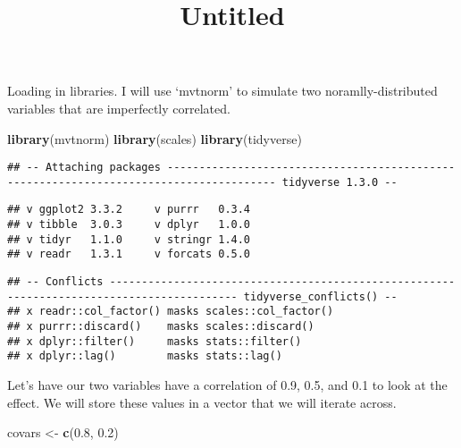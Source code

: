 \documentclass[
]{article}
\title{Untitled}
\author{}
\date{\vspace{-2.5em}}
\newenvironment{Shaded}{\begin{snugshade}}{\end{snugshade}}
\newcommand{\FloatTok}[1]{\textcolor[rgb]{0.00,0.00,0.81}{#1}}
\newcommand{\KeywordTok}[1]{\textcolor[rgb]{0.13,0.29,0.53}{\textbf{#1}}}
\newcommand{\NormalTok}[1]{#1}
\newcommand{\StringTok}[1]{\textcolor[rgb]{0.31,0.60,0.02}{#1}}
\begin{document}
\maketitle

Loading in libraries. I will use `mvtnorm' to simulate two
noramlly-distributed variables that are imperfectly correlated.

\begin{Shaded}
\begin{Highlighting}[]
\KeywordTok{library}\NormalTok{(mvtnorm)}
\KeywordTok{library}\NormalTok{(scales)}
\KeywordTok{library}\NormalTok{(tidyverse)}
\end{Highlighting}
\end{Shaded}

\begin{verbatim}
## -- Attaching packages --------------------------------------------------------------------------------------- tidyverse 1.3.0 --
\end{verbatim}

\begin{verbatim}
## v ggplot2 3.3.2     v purrr   0.3.4
## v tibble  3.0.3     v dplyr   1.0.0
## v tidyr   1.1.0     v stringr 1.4.0
## v readr   1.3.1     v forcats 0.5.0
\end{verbatim}

\begin{verbatim}
## -- Conflicts ------------------------------------------------------------------------------------------ tidyverse_conflicts() --
## x readr::col_factor() masks scales::col_factor()
## x purrr::discard()    masks scales::discard()
## x dplyr::filter()     masks stats::filter()
## x dplyr::lag()        masks stats::lag()
\end{verbatim}

Let's have our two variables have a correlation of 0.9, 0.5, and 0.1 to
look at the effect. We will store these values in a vector that we will
iterate across.

\begin{Shaded}
\begin{Highlighting}[]
\NormalTok{covars <-}\StringTok{ }\KeywordTok{c}\NormalTok{(}\FloatTok{0.8}\NormalTok{, }\FloatTok{0.2}\NormalTok{)}
\end{Highlighting}
\end{Shaded}
\end{document}
